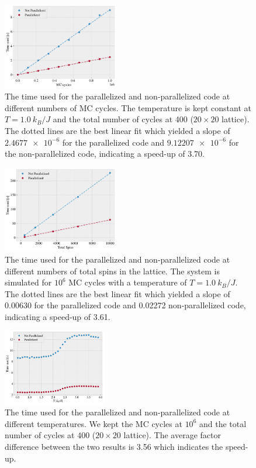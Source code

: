 \documentclass[%
 reprint,
nofootinbib,
aps,
]{revtex4-1}
\begin{document}
 \begin{figure}  
  \centering
  \includegraphics[width=0.45\textwidth]{figures/tmMCcycles.pdf}
  \caption{The time used for the parallelized and non-parallelized code at different numbers of MC cycles. The temperature is kept constant at $T = 1.0 \ k_B/J$ and the total number of cycles at 400 ($20\times20$ lattice). The dotted lines are the best linear fit which yielded a slope of $\num{2.4677e-6}$ for the parallelized code and $\num{9.12207e-6}$ for the non-parallelized code, indicating a  speed-up of 3.70.}
  \label{fig:tmMCcycles}
\end{figure}
 \begin{figure}  
  \centering
  \includegraphics[width=0.45\textwidth]{figures/tmSpins.pdf}
  \caption{The time used for the parallelized and non-parallelized code at different numbers of total spins in the lattice. The system is simulated for $10^6$ MC cycles with a temperature of $T = 1.0 \ k_B/J$. The dotted lines are the best linear fit which yielded a slope of 0.00630 for the parallelized code and 0.02272 non-parallelized code, indicating a  speed-up of 3.61.}
  \label{fig:tmSpins}
 \end{figure}
  \begin{figure}  
  \centering
  \includegraphics[width=0.40\textwidth]{figures/tmTemp.pdf}
  \caption{The time used for the parallelized and non-parallelized code at different temperatures. We kept the MC cycles at $10^6$ and the total number of cycles at 400 ($20\times20$ lattice). The average factor difference between the two results is 3.56 which indicates the speed-up.} 
  \label{fig:tmTemp}
\end{figure}
\end{document}
